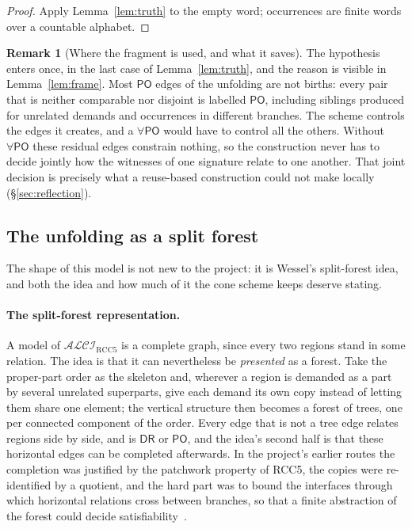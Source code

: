 \documentclass[11pt]{article}
\newcommand{\ALCIRCC}[1]{\mathcal{ALCI}_{\mathrm{RCC#1}}}
\newcommand{\DR}{\mathsf{DR}}
\newcommand{\PO}{\mathsf{PO}}
\theoremstyle{plain}
\theoremstyle{definition}
\newtheorem{remark}[theorem]{Remark}
\begin{document}
\begin{proof}
Apply Lemma~\ref{lem:truth} to the empty word; occurrences are finite words over
a countable alphabet.
\end{proof}

\begin{remark}[Where the fragment is used, and what it saves]
The hypothesis enters once, in the last case of Lemma~\ref{lem:truth}, and the
reason is visible in Lemma~\ref{lem:frame}. Most $\PO$ edges of the unfolding
are not births: every pair that is neither comparable nor disjoint is labelled
$\PO$, including siblings produced for unrelated demands and occurrences in
different branches. The scheme controls the edges it creates, and a
$\forall\PO$ would have to control all the others. Without $\forall\PO$ these
residual edges constrain nothing, so the construction never has to decide
jointly how the witnesses of one signature relate to one another. That joint
decision is precisely what a reuse-based construction could not make locally
(\S\ref{sec:reflection}).
\end{remark}

\subsection{The unfolding as a split forest}
\label{ssec:splitforest}

The shape of this model is not new to the project: it is Wessel's split-forest
idea, and both the idea and how much of it the cone scheme keeps deserve
stating.

\paragraph{The split-forest representation.} A model of $\ALCIRCC{5}$ is a
complete graph, since every two regions stand in some relation. The idea is
that it can nevertheless be \emph{presented} as a forest. Take the proper-part
order as the skeleton and, wherever a region is demanded as a part by several
unrelated superparts, give each demand its own copy instead of letting them
share one element; the vertical structure then becomes a forest of trees, one
per connected component of the order. Every edge that is not a tree edge
relates regions side by side, and is $\DR$ or $\PO$, and the idea's second
half is that these horizontal edges can be completed afterwards. In the
project's earlier routes the completion was justified by the patchwork
property of RCC5, the copies were re-identified by a quotient, and the hard
part was to bound the interfaces through which horizontal relations cross
between branches, so that a finite abstraction of the forest could decide
satisfiability~\cite{Overview}.
\end{document}
